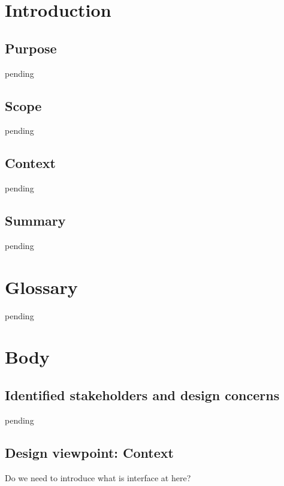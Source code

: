 \documentclass[letterpaper, 10pt,titlepage]{article}
\begin{document}
\tableofcontents
\newpage



\section{Introduction}
\subsection{Purpose}
pending

\subsection{Scope}
pending
                                       
\subsection{Context}
pending

\subsection{Summary}
pending

\vspace{0.3cm}



\section{Glossary}
pending



\section{Body}
\subsection{Identified stakeholders and design concerns}
pending







\subsection{Design viewpoint: Context}
Do we need to introduce what is interface at here?
\end{document}
